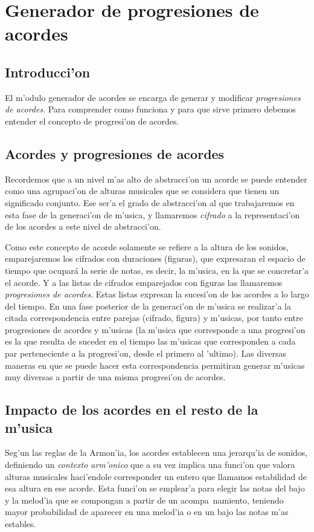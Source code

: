 ﻿\chapter{Generador de progresiones de acordes}
\section{Introducci'on}
El m'odulo generador de acordes se encarga de generar y modificar \emph{progresiones de acordes}. Para comprender como funciona y para que sirve primero debemos entender el concepto de progresi'on de acordes.

\section {Acordes y progresiones de acordes} 

Recordemos que a un nivel m'as alto de abstracci'on un acorde se puede entender como una agrupaci'on de alturas musicales que se considera que tienen un significado conjunto. Ese ser'a el grado de abstracci'on al que trabajaremos en esta fase de la generaci'on de m'usica, y llamaremos \emph{cifrado} a la representaci'on de los acordes a este nivel de abstracci'on. 

Como este concepto de acorde solamente se refiere a la altura de los sonidos, emparejaremos los cifrados con duraciones (figuras), que expresaran el espacio de tiempo que ocupar\'a la serie de notas, es decir, la m'usica, en la que se concretar'a el acorde. Y a las listas de cifrados emparejados con figuras las llamaremos \emph{progresiones de acordes}. Estas listas expresan la sucesi'on de los acordes a lo largo del tiempo. En una fase posterior de la generaci'on de m'usica se realizar'a la citada correspondencia entre parejas (cifrado, figura) y m'usicas, por tanto entre progresiones de acordes y m'usicas (la m'usica que corresponde a una progresi'on es la que resulta de suceder en el tiempo las m'usicas que corresponden a cada par perteneciente a la progresi'on, desde el primero al 'ultimo). Las diversas maneras en que se puede hacer esta correspondencia permitiran generar m'usicas muy diversas a partir de una misma progresi'on de acordes.

\section {Impacto de los acordes en el resto de la m'usica}
Seg'un las reglas de la Armon'ia, los acordes establecen una jerarqu'ia de sonidos, definiendo un \emph{contexto arm'onico} que a su vez implica una funci'on que valora alturas musicales haci'endole corresponder un entero que llamamos estabilidad de esa altura en ese acorde. Esta funci'on se emplear'a para elegir las notas del bajo y la melod'ia que se compongan a partir de un acompa~namiento, teniendo mayor probabilidad de aparecer en una melod'ia o en un bajo las notas m'as estables.

